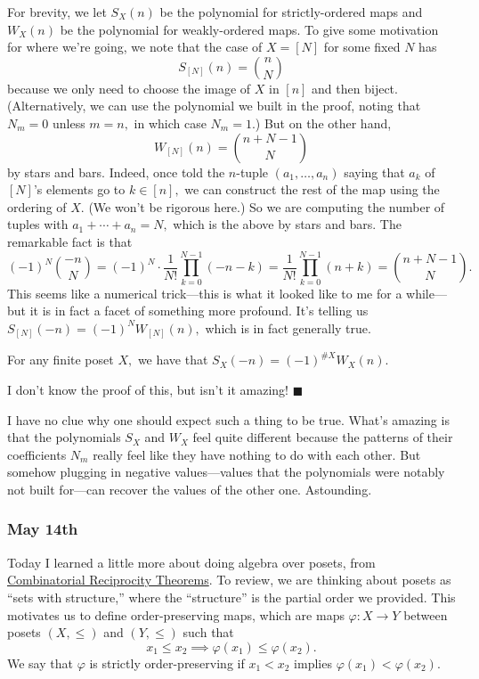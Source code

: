 For brevity, we let $S_X(n)$ be the polynomial for strictly-ordered maps and $W_X(n)$ be the polynomial for weakly-ordered maps. To give some motivation for where we're going, we note that the case of $X=[N]$ for some fixed $N$ has
\[S_{[N]}(n)=\binom nN\]
because we only need to choose the image of $X$ in $[n]$ and then biject. (Alternatively, we can use the polynomial we built in the proof, noting that $N_m=0$ unless $m=n,$ in which case $N_m=1.$) But on the other hand,
\[W_{[N]}(n)=\binom{n+N-1}N\]
by stars and bars. Indeed, once told the $n$-tuple $(a_1,\ldots,a_n)$ saying that $a_k$ of $[N]$'s elements go to $k\in[n],$ we can construct the rest of the map using the ordering of $X.$ (We won't be rigorous here.) So we are computing the number of tuples with $a_1+\cdots+a_n=N,$ which is the above by stars and bars. The remarkable fact is that
\[(-1)^N\binom{-n}N=(-1)^N\cdot\frac1{N!}\prod_{k=0}^{N-1}(-n-k)=\frac1{N!}\prod_{k=0}^{N-1}(n+k)=\binom{n+N-1}N.\]
This seems like a numerical trick---this is what it looked like to me for a while---but it is in fact a facet of something more profound. It's telling us $S_{[N]}(-n)=(-1)^NW_{[N]}(n),$ which is in fact generally true.
\begin{theorem}
    For any finite poset $X,$ we have that $S_X(-n)=(-1)^{\#X}W_X(n).$
\end{theorem}
I don't know the proof of this, but isn't it amazing! $\blacksquare$

I have no clue why one should expect such a thing to be true. What's amazing is that the polynomials $S_X$ and $W_X$ feel quite different because the patterns of their coefficients $N_m$ really feel like they have nothing to do with each other. But somehow plugging in negative values---values that the polynomials were notably not built for---can recover the values of the other one. Astounding.

\subsubsection{May 14th}
Today I learned a little more about doing algebra over posets, from \href{https://web.archive.org/web/20201112023302/http://math.sfsu.edu/beck/papers/crt.pdf}{Combinatorial Reciprocity Theorems}. To review, we are thinking about posets as ``sets with structure,'' where the ``structure'' is the partial order we provided. This motivates us to define order-preserving maps, which are maps $\varphi:X\to Y$ between posets $(X,\le)$ and $(Y,\le)$ such that
\[x_1\le x_2\implies\varphi(x_1)\le\varphi(x_2).\]
We say that $\varphi$ is strictly order-preserving if $x_1<x_2$ implies $\varphi(x_1)<\varphi(x_2).$

